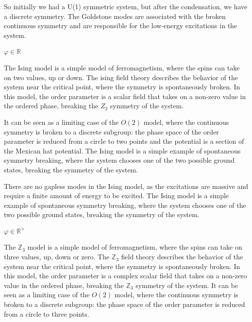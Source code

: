 So initially we had a U(1) symmetric system, but after the condensation, we have a discrete symmetry. The Goldstone modes are associated with the broken continuous symmetry and are responsible for the low-energy excitations in the system.

\begin{example}

    \(\varphi \in \mathbb{R}\)

    The Ising model is a simple model of ferromagnetism, where the spins can take on two values, up or down. The ising field theory describes the behavior of the system near the critical point, where the symmetry is spontaneously broken. In this model, the order parameter is a scalar field that takes on a non-zero value in the ordered phase, breaking the \(Z_2\) symmetry of the system.

    It can be seen as a limiting case of the \(O(2)\) model, where the continuous symmetry is broken to a discrete subgroup: the phase space of the order parameter is reduced from a circle to two points and the potential is a section of the Mexican hat potential. The Ising model is a simple example of spontaneous symmetry breaking, where the system chooses one of the two possible ground states, breaking the symmetry of the system.

    There are no gapless modes in the Ising model, as the excitations are massive and require a finite amount of energy to be excited. The Ising model is a simple example of spontaneous symmetry breaking, where the system chooses one of the two possible ground states, breaking the symmetry of the system.
\end{example}

\begin{example}

    \(\varphi \in \mathbb{R}^+\)

    The \(\mathbb{Z}_3\) model is a simple model of ferromagnetism, where the spins can take on three values, up, down or zero. The \(\mathbb{Z}_3\) field theory describes the behavior of the system near the critical point, where the symmetry is spontaneously broken. In this model, the order parameter is a complex scalar field that takes on a non-zero value in the ordered phase, breaking the \(\mathbb{Z}_3\) symmetry of the system.
    It can be seen as a limiting case of the \(O(2)\) model, where the continuous symmetry is broken to a discrete subgroup: the phase space of the order parameter is reduced from a circle to three points.

\end{example}


